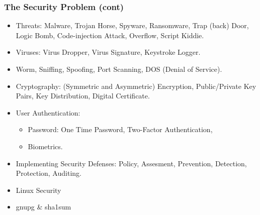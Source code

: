 \documentclass[aspectratio=169, xcolor=table, notheorems, hyperref={pdfpagelabels=false}]{beamer}
\begin{document}
\begin{frame}[fragile]
\frametitle{The Security Problem (cont)}
\begin{itemize}
\item Threats: Malware, Trojan Horse, Spyware, Ransomware, Trap (back) Door,
      Logic Bomb, Code-injection Attack, Overflow, Script Kiddie.
\item Viruses: Virus Dropper, Virus Signature, Keystroke Logger.
\item Worm, Sniffing, Spoofing, Port Scanning, DOS (Denial of Service).
\item Cryptography: (Symmetric and Asymmetric) Encryption, Public/Private Key Pairs,
      Key Distribution, Digital Certificate.
\item User Authentication: 
\begin{itemize}
\item Password: One Time Password, Two-Factor Authentication,
\item Biometrics.
\end{itemize}
\item Implementing Security Defenses: Policy, Assesment, Prevention, Detection, Protection, Auditing.
\item Linux Security
\item gnupg \& sha1sum
\end{itemize}
\end{frame}

\end{document}
